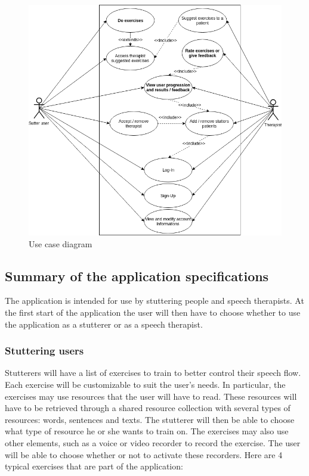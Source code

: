 \begin{figure}[h]
  \includegraphics[width=.9\linewidth]{content/imgs/usecase.png}
  \caption{Use case diagram}
  \label{fig:srs}
\end{figure}

\subsection{Summary of the application specifications}
\label{sec:resume_cdc}

The application is intended for use by stuttering people and speech therapists. At the first start of the application the user will then have to choose whether to use the application as a stutterer or as a speech therapist.

\subsubsection{Stuttering users}

Stutterers will have a list of exercises to train to better control their speech flow. Each exercise will be customizable to suit the user's needs. In particular, the exercises may use resources that the user will have to read. These resources will have to be retrieved through a shared resource collection with several types of resources: words, sentences and texts. The stutterer will then be able to choose what type of resource he or she wants to train on. The exercises may also use other elements, such as a voice or video recorder to record the exercise. The user will be able to choose whether or not to activate these recorders. Here are 4 typical exercises that are part of the application:

